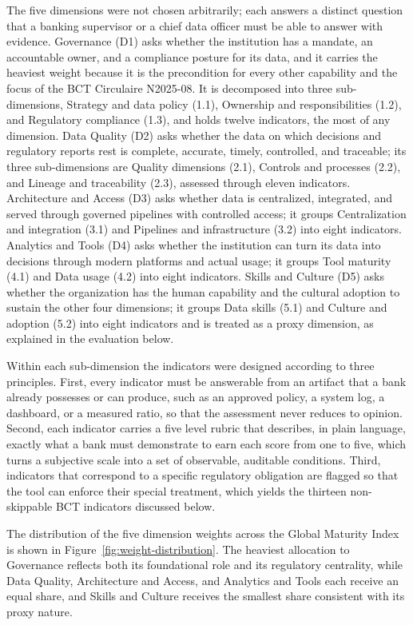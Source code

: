 The five dimensions were not chosen arbitrarily; each answers a distinct question that a banking supervisor or a chief data officer must be able to answer with evidence. Governance (D1) asks whether the institution has a mandate, an accountable owner, and a compliance posture for its data, and it carries the heaviest weight because it is the precondition for every other capability and the focus of the BCT Circulaire N\textdegree{}2025-08. It is decomposed into three sub-dimensions, Strategy and data policy (1.1), Ownership and responsibilities (1.2), and Regulatory compliance (1.3), and holds twelve indicators, the most of any dimension. Data Quality (D2) asks whether the data on which decisions and regulatory reports rest is complete, accurate, timely, controlled, and traceable; its three sub-dimensions are Quality dimensions (2.1), Controls and processes (2.2), and Lineage and traceability (2.3), assessed through eleven indicators. Architecture and Access (D3) asks whether data is centralized, integrated, and served through governed pipelines with controlled access; it groups Centralization and integration (3.1) and Pipelines and infrastructure (3.2) into eight indicators. Analytics and Tools (D4) asks whether the institution can turn its data into decisions through modern platforms and actual usage; it groups Tool maturity (4.1) and Data usage (4.2) into eight indicators. Skills and Culture (D5) asks whether the organization has the human capability and the cultural adoption to sustain the other four dimensions; it groups Data skills (5.1) and Culture and adoption (5.2) into eight indicators and is treated as a proxy dimension, as explained in the evaluation below.

Within each sub-dimension the indicators were designed according to three principles. First, every indicator must be answerable from an artifact that a bank already possesses or can produce, such as an approved policy, a system log, a dashboard, or a measured ratio, so that the assessment never reduces to opinion. Second, each indicator carries a five level rubric that describes, in plain language, exactly what a bank must demonstrate to earn each score from one to five, which turns a subjective scale into a set of observable, auditable conditions. Third, indicators that correspond to a specific regulatory obligation are flagged so that the tool can enforce their special treatment, which yields the thirteen non-skippable BCT indicators discussed below.

The distribution of the five dimension weights across the Global Maturity Index is shown in Figure~\ref{fig:weight-distribution}. The heaviest allocation to Governance reflects both its foundational role and its regulatory centrality, while Data Quality, Architecture and Access, and Analytics and Tools each receive an equal share, and Skills and Culture receives the smallest share consistent with its proxy nature.

